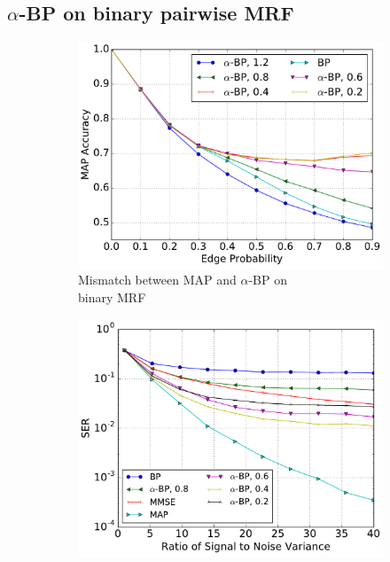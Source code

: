\documentclass[conference,onecolumn]{IEEEtran}
\begin{document}
\subsection{$\alpha$-BP on binary pairwise MRF}
\begin{figure}[!ht]
  \begin{subfigure}{.339\textwidth}
    \captionsetup[subfigure]{justification=centering}
    \centering
    \includegraphics[width=1\linewidth]{figures/MAPacc_edgeP_sum_crop.pdf}
    \vspace{-0.6cm}
    \caption{Mismatch between MAP and $\alpha$-BP on\\ binary MRF}
    \label{fig:mismatch}
  \end{subfigure}
  \begin{subfigure}{.33\textwidth}
    \includegraphics[width=1\linewidth]{figures/alpha_compare_crop.pdf}

\end{subfigure}
\end{figure}
\end{document}
